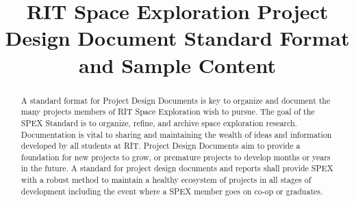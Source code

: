 \documentclass[conference]{IEEEtran} %
\title{RIT Space Exploration Project Design Document Standard Format and Sample Content}
\author{
  \IEEEauthorblockN{%
    Philip~Linden\IEEEauthorrefmark{1},  %
    T.J.~Tarazevits\IEEEauthorrefmark{2},
    Drew~Walters\IEEEauthorrefmark{3},
    and
    Austin~Bodzas\IEEEauthorrefmark{4}
  }
  \IEEEauthorblockA{%
    RIT Space Exploration, Rochester Institute of Technology \\ %
    Rochester, N.Y. \\
    Email:
    \IEEEauthorrefmark{1}pjl7651@rit.edu,
    \IEEEauthorrefmark{2}tjt3085@rit.edu,
    \IEEEauthorrefmark{3}acw4729@rit.edu,
    \IEEEauthorrefmark{4}abb6499@rit.edu
  }

}
\begin{document}
\maketitle%

\begin{abstract}
  A standard format for Project Design Documents is key to organize and document the many projects members of RIT Space Exploration wish to pursue.
  The goal of the SPEX Standard is to organize, refine, and archive space exploration research.
  Documentation is vital to sharing and maintaining the wealth of ideas and information developed by all students at RIT.\@
  Project Design Documents aim to provide a foundation for new projects to grow, or premature projects to develop months or years in the future.
  A standard for project design documents and reports shall provide SPEX with a robust method to maintain a healthy ecosystem of projects in all stages of development including the event where a SPEX member goes on co-op or graduates.

\end{abstract}

\label{sec:nomenclature}
\newcommand{\nomunit}[1]{%
\renewcommand{\nomentryend}{\hspace*{\fill}#1}}
\renewcommand{\nompreamble}{

  }
\printnomenclature{}
\end{document}
